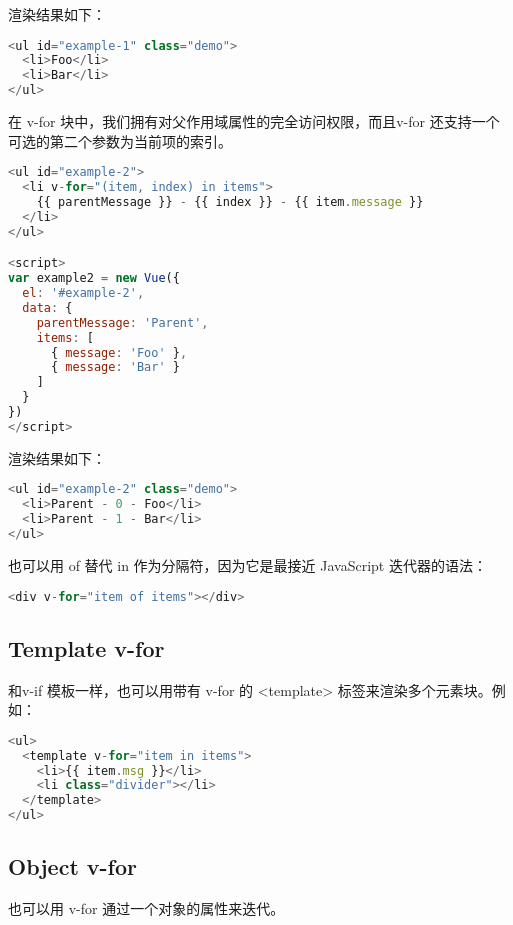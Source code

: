渲染结果如下：


\begin{lstlisting}[language=JavaScript]
<ul id="example-1" class="demo">
  <li>Foo</li>
  <li>Bar</li>
</ul>
\end{lstlisting}


在 v-for 块中，我们拥有对父作用域属性的完全访问权限，而且v-for 还支持一个可选的第二个参数为当前项的索引。





\begin{lstlisting}[language=JavaScript]
<ul id="example-2">
  <li v-for="(item, index) in items">
    {{ parentMessage }} - {{ index }} - {{ item.message }}
  </li>
</ul>

<script>
var example2 = new Vue({
  el: '#example-2',
  data: {
    parentMessage: 'Parent',
    items: [
      { message: 'Foo' },
      { message: 'Bar' }
    ]
  }
})
</script>
\end{lstlisting}

渲染结果如下：

\begin{lstlisting}[language=JavaScript]
<ul id="example-2" class="demo">
  <li>Parent - 0 - Foo</li>
  <li>Parent - 1 - Bar</li>
</ul>
\end{lstlisting}

也可以用 of 替代 in 作为分隔符，因为它是最接近 JavaScript 迭代器的语法：

\begin{lstlisting}[language=JavaScript]
<div v-for="item of items"></div>
\end{lstlisting}


\subsection{Template v-for}


和v-if 模板一样，也可以用带有 v-for 的 <template> 标签来渲染多个元素块。例如：

\begin{lstlisting}[language=JavaScript]
<ul>
  <template v-for="item in items">
    <li>{{ item.msg }}</li>
    <li class="divider"></li>
  </template>
</ul>
\end{lstlisting}

\subsection{Object v-for}

也可以用 v-for 通过一个对象的属性来迭代。


